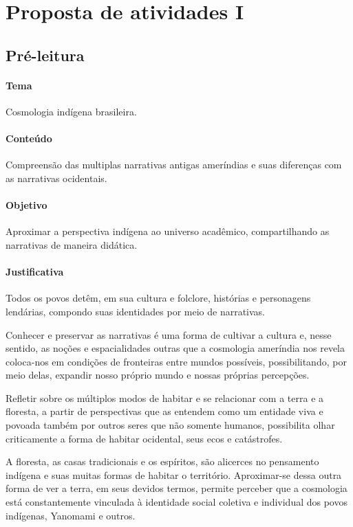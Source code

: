 \documentclass[12pt]{extarticle}
\begin{document}
\tableofcontents
\section{Proposta de atividades I}

\subsection{Pré-leitura}

%
\paragraph{Tema} Cosmologia indígena brasileira.

\paragraph{Conteúdo} Compreensão das multiplas narrativas antigas ameríndias
e suas diferenças com as narrativas ocidentais. 

\paragraph{Objetivo} Aproximar a perspectiva indígena ao universo acadêmico, 
compartilhando as narrativas de maneira didática.

\paragraph{Justificativa} Todos os povos detêm, em sua cultura e folclore,
histórias e personagens lendárias, compondo suas identidades por meio de
narrativas. 

Conhecer e preservar as narrativas é uma forma de
cultivar a cultura e, nesse sentido, as noções e espacialidades outras 
que a cosmologia ameríndia nos revela coloca-nos em condições de fronteiras 
entre mundos possíveis, possibilitando, por meio delas, expandir nosso 
próprio mundo e nossas próprias percepções.

Refletir sobre os múltiplos modos de habitar e se relacionar com a terra e 
a floresta, a partir de perspectivas que as entendem como um entidade
viva e povoada também por outros seres que não somente humanos, possibilita
olhar criticamente a forma de habitar ocidental, seus ecos e catástrofes.

A floresta, as casas tradicionais e os espíritos, são alicerces no pensamento 
indígena e suas muitas formas de habitar o território. Aproximar-se dessa outra
forma de ver a terra, em seus devidos termos, permite perceber que a cosmologia 
está constantemente vinculada à identidade social coletiva e individual dos povos
indígenas, Yanomami e outros. 
\end{document}
